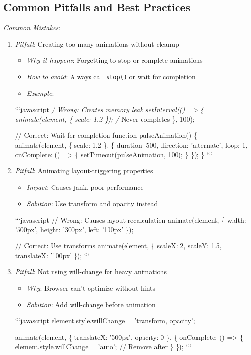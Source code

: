 \documentclass[11pt]{article}
\begin{document}
\subsection{Common Pitfalls and Best Practices}
\label{sec:orgec8975f}

\emph{Common Mistakes}:

\begin{enumerate}
\item \emph{Pitfall}: Creating too many animations without cleanup
\begin{itemize}
\item \emph{Why it happens}: Forgetting to stop or complete animations
\item \emph{How to avoid}: Always call \texttt{stop()} or wait for completion
\item \emph{Example}:
\end{itemize}
```javascript
\emph{/ Wrong: Creates memory leak
setInterval(() => \{
  animate(element, \{ scale: 1.2 \}); /} Never completes
\}, 100);

// Correct: Wait for completion
function pulseAnimation() \{
  animate(element, \{ scale: 1.2 \}, \{
    duration: 500,
    direction: 'alternate',
    loop: 1,
    onComplete: () => \{
      setTimeout(pulseAnimation, 100);
    \}
  \});
\}
```

\item \emph{Pitfall}: Animating layout-triggering properties
\begin{itemize}
\item \emph{Impact}: Causes jank, poor performance
\item \emph{Solution}: Use transform and opacity instead
\end{itemize}
```javascript
// Wrong: Causes layout recalculation
animate(element, \{
  width: '500px',
  height: '300px',
  left: '100px'
\});

// Correct: Use transforms
animate(element, \{
  scaleX: 2,
  scaleY: 1.5,
  translateX: '100px'
\});
```

\item \emph{Pitfall}: Not using will-change for heavy animations
\begin{itemize}
\item \emph{Why}: Browser can't optimize without hints
\item \emph{Solution}: Add will-change before animation
\end{itemize}
```javascript
element.style.willChange = 'transform, opacity';

animate(element, \{
  translateX: '500px',
  opacity: 0
\}, \{
  onComplete: () => \{
    element.style.willChange = 'auto'; // Remove after
  \}
\});
```
\end{enumerate}
\end{document}
